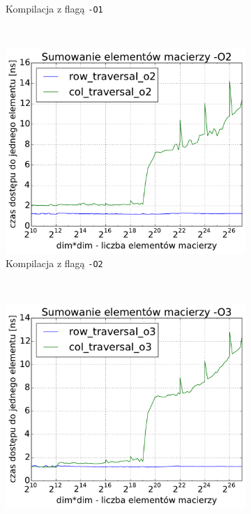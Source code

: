 \begin{figure}[!h]
\begin{subfigure}[c]{0.45\textwidth}
        \caption{Kompilacja z flagą \texttt{-O1}}
    \end{subfigure}
    \\
    \vspace{0.4cm}
    \begin{subfigure}[c]{0.45\textwidth}
        \centering
        \includegraphics[width=\textwidth]{images/benchs_xeon/matrix_sum_O2}
        \caption{Kompilacja z flagą \texttt{-O2}}
    \end{subfigure}
    ~
    \begin{subfigure}[c]{0.45\textwidth}
        \centering
        \includegraphics[width=\textwidth]{images/benchs_xeon/matrix_sum_O3}

\end{subfigure}
\end{figure}
